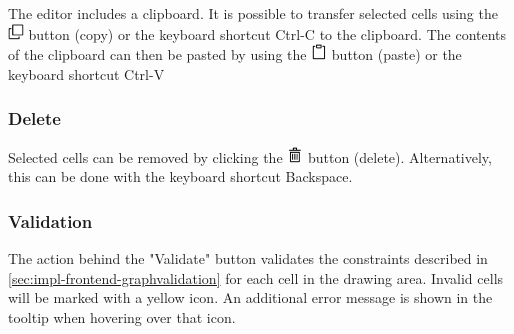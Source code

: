 \documentclass[a4paper,top=25mm,bottom=25mm,12pt,pdftex,halfparskip,twoside,bibtotoc,numbers=noenddot]{scrbook}
\begin{document}
The editor includes a clipboard. It is possible to transfer selected cells using the \includegraphics[height=12pt]{editor-toolbar-clone}
 button (copy) or the keyboard shortcut \textsf{Ctrl-C} to the clipboard.
The contents of the clipboard can then be pasted by using the \includegraphics[height=12pt]{editor-toolbar-clipboard} button (paste) or the keyboard shortcut \textsf{Ctrl-V}

\subsubsection{Delete}

Selected cells can be removed by clicking the \includegraphics[height=12pt]{editor-toolbar-trash} button (delete). Alternatively, this can be done with the keyboard shortcut \textsf{Backspace}.

\subsubsection{Validation}

The action behind the "Validate" button validates the constraints described in \ref{sec:impl-frontend-graphvalidation} for each cell in the drawing area. Invalid cells will be marked with a yellow icon. An additional error message is shown in the tooltip when hovering over that icon.
\end{document}
